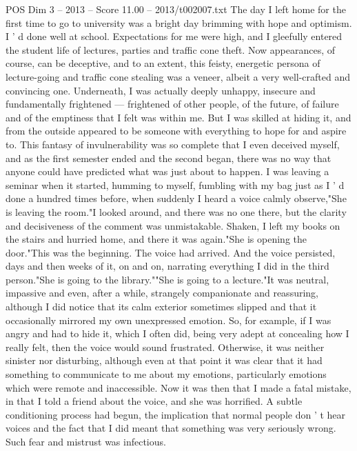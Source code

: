 \begin{textsample}{POS Dim 3 – 2013 – Score 11.00 – 2013/t002007.txt}  \label{ex:f3_pos_051}
The day I left home for the first time to go to university was a bright day brimming with hope and optimism.
I ' d done well at school.
Expectations for me were high, and I gleefully entered the student life of lectures, parties and traffic cone theft.
Now appearances, of course, can be deceptive, and to an extent, this feisty, energetic persona of lecture-going and traffic cone stealing was a veneer, albeit a very well-crafted and convincing one.
Underneath, I was actually deeply unhappy, insecure and fundamentally frightened — frightened of other people, of the future, of failure and of the emptiness that I felt was within me.
But I was skilled at hiding it, and from the outside appeared to be someone with everything to hope for and aspire to.
This fantasy of invulnerability was so complete that I even deceived myself, and as the first semester ended and the second began, there was no way that anyone could have predicted what was just about to happen.
I was leaving a seminar when it started, humming to myself, fumbling with my bag just as I ' d done a hundred times before, when suddenly I heard a voice calmly observe,"She is leaving the room."I looked around, and there was no one there, but the clarity and decisiveness of the comment was unmistakable.
Shaken, I left my books on the stairs and hurried home, and there it was again."She is opening the door."This was the beginning.
The voice had arrived.
And the voice persisted, days and then weeks of it, on and on, narrating everything I did in the third person."She is going to the library.""She is going to a lecture."It was neutral, impassive and even, after a while, strangely companionate and reassuring, although I did notice that its calm exterior sometimes slipped and that it occasionally mirrored my own unexpressed emotion.
So, for example, if I was angry and had to hide it, which I often did, being very adept at concealing how I really felt, then the voice would sound frustrated.
Otherwise, it was neither sinister nor disturbing, although even at that point it was clear that it had something to communicate to me about my emotions, particularly emotions which were remote and inaccessible.
Now it was then that I made a fatal mistake, in that I told a friend about the voice, and she was horrified.
A subtle conditioning process had begun, the implication that normal people don ' t hear voices and the fact that I did meant that something was very seriously wrong.
Such fear and mistrust was infectious.

\end{textsample}
